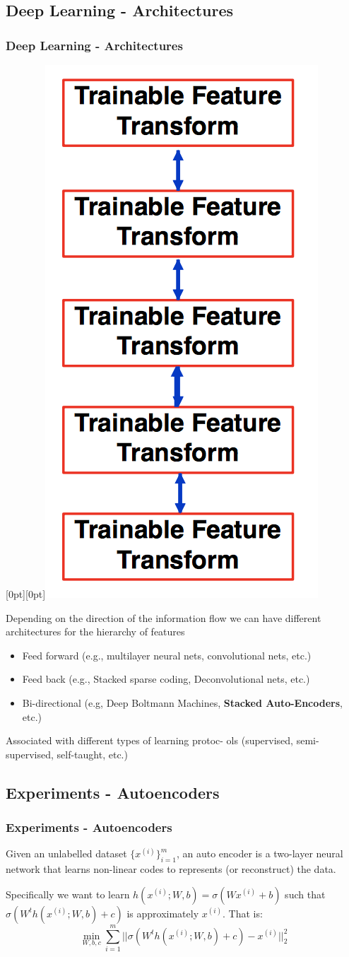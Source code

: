 \documentclass[professionalfont]{beamer}
\newcommand{\lenitem}[2][.7\linewidth]{\parbox[t]{#1}{\strut #2\strut}}
\begin{document}
  \subsection{Deep Learning - Architectures}
  \begin{frame}
    \frametitle{Deep Learning - Architectures}
    \mbox{}\hfill\raisebox{-\height}[0pt][0pt]{\includegraphics[width=.25\linewidth]{deep4.png}}
    \vspace*{-\baselineskip}


    Depending on the direction of the information flow we can have different architectures for the hierarchy of features
    \begin{itemize}
      \item \lenitem{Feed forward (e.g., multilayer neural nets, convolutional nets, etc.)}
      \item \lenitem{Feed back (e.g., Stacked sparse coding, Deconvolutional nets, etc.)}
      \item \lenitem{Bi-directional (e.g, Deep Boltmann Machines, \textbf{Stacked Auto-Encoders}, etc.)}
    \end{itemize}
    Associated with different types of learning
    protoc- \newline ols (supervised, semi-supervised, self-taught, etc.)
  \end{frame}



  \subsection{Experiments - Autoencoders}
	\begin{frame}
    \frametitle{Experiments - Autoencoders}
    Given an unlabelled dataset $\{x^{(i)}\}_{i=1}^m$, an auto encoder is a two-layer neural
    network that learns non-linear codes to represents (or reconstruct) the data.\newline\newline

    Specifically we want to learn $h(x^{(i)}; W, b) = \sigma(Wx^{(i)} + b)$ such that $\sigma(W^{t} h(x^{(i)}; W, b) + c)$
    is approximately $x^{(i)}$. That is:
    \begin{equation*}
      \min_{W,b,c} \sum_{i=1}^{m} ||\sigma(W^{t} h(x^{(i)}; W, b) + c) - x^{(i)}||_{2}^{2}
    \end{equation*}
  \end{frame}
\end{document}
